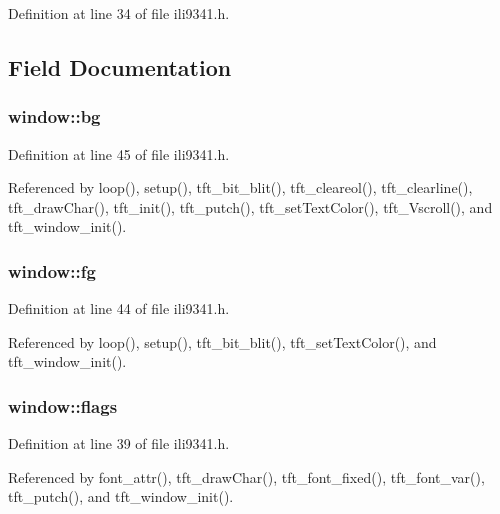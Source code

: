 Definition at line 34 of file ili9341.\-h.



\subsection{Field Documentation}
\hypertarget{structwindow_affcf5d29153103c2537542f5a4f8ba87}{
\subsubsection[{bg}]{ window\-::bg}}\label{structwindow_affcf5d29153103c2537542f5a4f8ba87}


Definition at line 45 of file ili9341.\-h.



Referenced by loop(), setup(), tft\-\_\-bit\-\_\-blit(), tft\-\_\-cleareol(), tft\-\_\-clearline(), tft\-\_\-draw\-Char(), tft\-\_\-init(), tft\-\_\-putch(), tft\-\_\-set\-Text\-Color(), tft\-\_\-\-Vscroll(), and tft\-\_\-window\-\_\-init().

\hypertarget{structwindow_ac8739cdb3c50efcc1deaa5ab955a5e62}{
\subsubsection[{fg}]{ window\-::fg}}\label{structwindow_ac8739cdb3c50efcc1deaa5ab955a5e62}


Definition at line 44 of file ili9341.\-h.



Referenced by loop(), setup(), tft\-\_\-bit\-\_\-blit(), tft\-\_\-set\-Text\-Color(), and tft\-\_\-window\-\_\-init().

\hypertarget{structwindow_ad58fae853f87093ef4f0139df0a3f33d}{
\subsubsection[{flags}]{ window\-::flags}}\label{structwindow_ad58fae853f87093ef4f0139df0a3f33d}


Definition at line 39 of file ili9341.\-h.



Referenced by font\-\_\-attr(), tft\-\_\-draw\-Char(), tft\-\_\-font\-\_\-fixed(), tft\-\_\-font\-\_\-var(), tft\-\_\-putch(), and tft\-\_\-window\-\_\-init().

